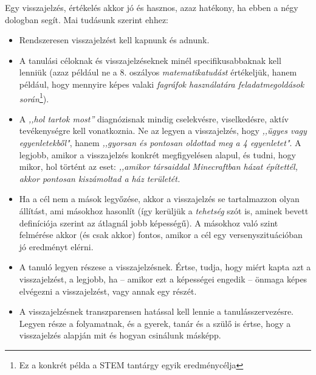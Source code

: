 Egy visszajelzés, értékelés akkor jó és hasznos, azaz hatékony, ha ebben a négy
dologban segít. Mai tudásunk szerint ehhez:
\begin{itemize}
  \item Rendszeresen visszajelzést kell kapnunk és adnunk.
  \item A tanulási céloknak és visszajelzéseknek minél specifikusabbaknak kell
        lenniük (azaz például ne a 8. oszályos \emph{matematikatudást} értékeljük,
        hanem például, hogy mennyire képes valaki \emph{fagráfok használatára
          feladatmegoldások során}\footnote{Ez a konkrét példa a STEM tantárgy egyik
          eredménycélja}).
  \item A \emph{,,hol tartok most''} diagnózisnak mindig cselekvésre,
        viselkedésre, aktív tevékenységre kell vonatkoznia. Ne az legyen a
        visszajelzés, hogy \emph{,,ügyes vagy egyenletekből"}, hanem \emph{,,gyorsan és
          pontosan oldottad meg a 4 egyenletet"}. A legjobb, amikor a visszajelzés
        konkrét megfigyelésen alapul, és tudni, hogy mikor, hol történt az eset:
        \emph{,,amikor társaiddal Minecraftban házat építettél, akkor pontosan
          kiszámoltad a ház területét.}
  \item Ha a cél nem a mások legyőzése, akkor a visszajelzés se tartalmazzon
        olyan állítást, ami másokhoz hasonlít (így kerüljük a \emph{tehetség} szót is,
        aminek bevett definíciója szerint az átlagnál jobb képességű). A másokhoz való
        szint felmérése akkor (és csak akkor) fontos, amikor a cél egy
        versenyszituációban jó eredményt elérni.

  \item A tanuló legyen részese a visszajelzésnek. Értse, tudja, hogy miért kapta
        azt a visszajelzést, a legjobb, ha -- amikor ezt a képességei engedik -- önmaga
        képes elvégezni a visszajelzést, vagy annak egy részét.
  \item A visszajelzésnek transzparensen hatással kell lennie a
        tanulásszervezésre. Legyen része a folyamatnak, és a gyerek, tanár és a szülő
        is értse, hogy a visszajelzés alapján mit és hogyan csinálunk másképp.
\end{itemize}

